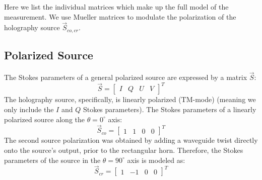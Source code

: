 Here we list the individual matrices which make up the full model of the measurement.  We use Mueller matrices to modulate the polarization of the holography source $\vec{S}_{co,cr}$.  

\subsection{Polarized Source}
The Stokes parameters of a general polarized source are expressed by a matrix $\vec{S}$:
\begin{equation}\vec{S} = 
    \begin{bmatrix}
    I & Q & U & V
    \end{bmatrix}^T
\end{equation}
The holography source, specifically, is linearly polarized (TM-mode) (meaning we only include the $I$ and $Q$ Stokes parameters).  The Stokes parameters of a linearly polarized source along the $\theta=0^\circ$ axis:
\begin{equation}\vec{S}_{co} = 
    \begin{bmatrix}
    1 & 1 & 0 & 0
    \end{bmatrix}^T
\end{equation}
The second source polarization was obtained by adding a waveguide twist directly onto the source's output, prior to the rectangular horn.  Therefore, the Stokes parameters of the source in the $\theta=90^\circ$ axis is modeled as:
\begin{equation}\vec{S}_{cr} = 
    \begin{bmatrix}
    1 & -1 & 0 & 0
    \end{bmatrix}^T
\end{equation}
